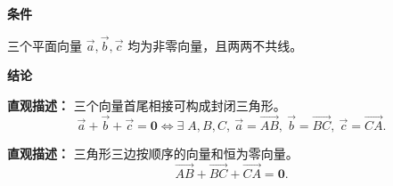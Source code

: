 \begin{statementbox}
	\textbf{\textcolor{CStatement}{条件}}
	\begin{description}[style=nextline, leftmargin=2.8em, labelsep=0.5em, itemsep=0.35em]
		\item[\textbf{\textcolor{CStatement}{条件 1（非零且不共线）：}}]
		      三个平面向量 $\vec{a},\vec{b},\vec{c}$ 均为非零向量，且两两不共线。
	\end{description}
	\textbf{\textcolor{CStatement}{结论}}
	\begin{description}[style=nextline, leftmargin=2.8em, labelsep=0.5em, itemsep=0.45em]
		\item[\textbf{\textcolor{CStatement}{结论一（和为零与三角形）：}}]
		      \textbf{\textcolor{CStatement}{直观描述：}}
		      三个向量首尾相接可构成封闭三角形。
		      \[
			      \vec{a}+\vec{b}+\vec{c}=\mathbf{0}
			      \iff
			      \exists\;A,B,C,\ \vec{a}=\overrightarrow{AB},\ \vec{b}=\overrightarrow{BC},\ \vec{c}=\overrightarrow{CA}.
		      \]
		\item[\textbf{\textcolor{CStatement}{推广结论（三角形回路）：}}]
		      \textbf{\textcolor{CStatement}{直观描述：}}
		      三角形三边按顺序的向量和恒为零向量。
		      \[
			      \overrightarrow{AB}+\overrightarrow{BC}+\overrightarrow{CA}=\mathbf{0}.
		      \]
	\end{description}

\end{statementbox}